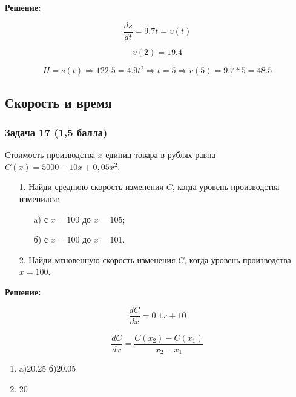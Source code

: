 \documentclass[a4paper,12pt]{article}
\begin{document}
\textbf{Решение:}

\[
\frac{ds}{dt} = 9.7t = v(t)
\]

\[
v(2) = 19.4
\]

\[
H = s(t) \Rightarrow 122.5 = 4.9t^2 \Rightarrow t = 5 \Rightarrow v(5) = 9.7*5 = 48.5
\]

\vspace{1cm}

\subsection{Скорость и время}

\subsubsection{Задача 17 (1,5 балла)}
Стоимость производства \( x \) единиц товара в рублях равна \( C(x) = 5000 + 10x + 0{,}05x^2 \).
\begin{enumerate}
    \item[1.] Найди среднюю скорость изменения \( C \), когда уровень производства изменился:
    \begin{enumerate}
        \item[a)] с \( x = 100 \) до \( x = 105 \);
        \item[б)] с \( x = 100 \) до \( x = 101 \).
    \end{enumerate}
    \item[2.] Найди мгновенную скорость изменения \( C \), когда уровень производства \( x = 100 \).
\end{enumerate}

\textbf{Решение:}

\[
\frac{dC}{dx} = 0.1x + 10
\]

\[
\overline{\frac{dC}{dx}} = \frac{C(x_2) - C(x_1)}{x_2 - x_1}
\]
\begin{enumerate}
    \item a)20.25 б)20.05
    \item 20
    
\end{enumerate}




\vspace{1cm}
\end{document}
